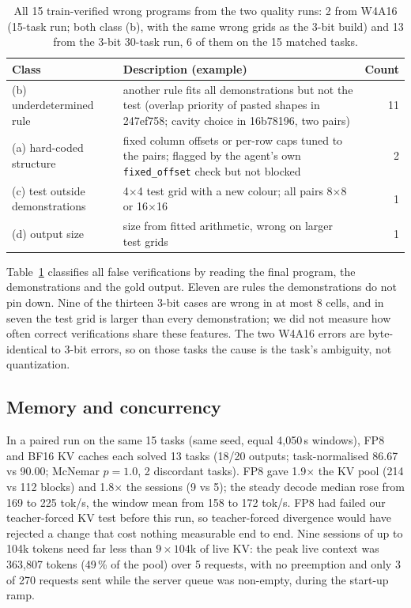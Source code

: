 \documentclass[11pt]{article}
\begin{document}
\begin{table}[tbp]
\centering\small
\begin{tabularx}{\linewidth}{@{}lXr@{}}
\toprule
Class & Description (example) & Count \\
\midrule
(b) underdetermined rule & another rule fits all demonstrations but not the test (overlap priority of pasted shapes in 247ef758; cavity choice in 16b78196, two pairs) & 11 \\
(a) hard-coded structure & fixed column offsets or per-row caps tuned to the pairs; flagged by the agent's own \texttt{fixed\_offset} check but not blocked & 2 \\
(c) test outside demonstrations & 4$\times$4 test grid with a new colour; all pairs 8$\times$8 or 16$\times$16 & 1 \\
(d) output size & size from fitted arithmetic, wrong on larger test grids & 1 \\
\bottomrule
\end{tabularx}
\caption{All 15 train-verified wrong programs from the two quality runs: 2 from W4A16 (15-task run; both class (b), with the same wrong grids as the 3-bit build) and 13 from the 3-bit 30-task run, 6 of them on the 15 matched tasks.}
\label{tab:fv}
\end{table}
Table~\ref{tab:fv} classifies all false verifications by reading the final program, the demonstrations and the gold output. Eleven are rules the demonstrations do not pin down. Nine of the thirteen 3-bit cases are wrong in at most 8 cells, and in seven the test grid is larger than every demonstration; we did not measure how often correct verifications share these features. The two W4A16 errors are byte-identical to 3-bit errors, so on those tasks the cause is the task's ambiguity, not quantization.

\subsection{Memory and concurrency}
In a paired run on the same 15 tasks (same seed, equal 4{,}050\,s windows), FP8 and BF16 KV caches each solved 13 tasks (18/20 outputs; task-normalised 86.67 vs 90.00; McNemar $p=1.0$, 2 discordant tasks). FP8 gave 1.9$\times$ the KV pool (214 vs 112 blocks) and 1.8$\times$ the sessions (9 vs 5); the steady decode median rose from 169 to 225 tok/s, the window mean from 158 to 172 tok/s. FP8 had failed our teacher-forced KV test before this run, so teacher-forced divergence would have rejected a change that cost nothing measurable end to end. Nine sessions of up to 104k tokens need far less than $9\times104$k of live KV: the peak live context was 363{,}807 tokens (49\,\% of the pool) over 5 requests, with no preemption and only 3 of 270 requests sent while the server queue was non-empty, during the start-up ramp.
\end{document}
